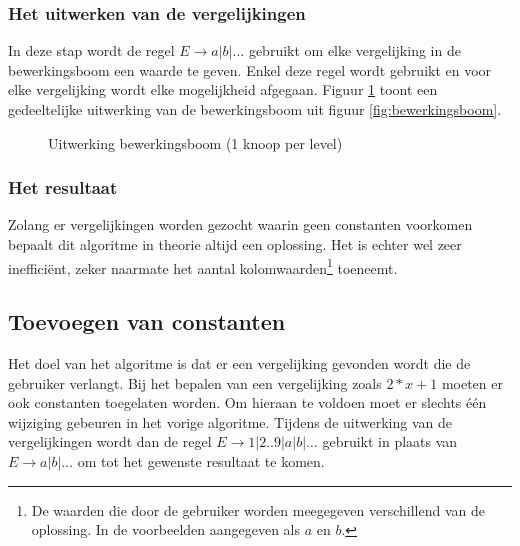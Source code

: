\documentclass[Main.tex]{subfiles}
\begin{document}
\subsubsection*{Het uitwerken van de vergelijkingen}
In deze stap wordt de regel $E \rightarrow a | b | \dotsc$ gebruikt om elke vergelijking in de bewerkingsboom een waarde te geven. Enkel deze regel wordt gebruikt en voor elke vergelijking wordt elke mogelijkheid afgegaan. Figuur \ref{fig:uitwerkingsboom} toont een gedeeltelijke uitwerking van de bewerkingsboom uit figuur \ref{fig:bewerkingsboom}.
\begin{figure}[!htb]
\centering
{}
\caption{Uitwerking bewerkingsboom (1 knoop per level)} \label{fig:uitwerkingsboom}
\end{figure}
\subsubsection*{Het resultaat}
Zolang er vergelijkingen worden gezocht waarin geen constanten voorkomen bepaalt dit algoritme in theorie altijd een oplossing. Het is echter wel zeer ineffici\"ent, zeker naarmate het aantal kolomwaarden\footnote{\label{note:kolomwaarden} De waarden die door de gebruiker worden meegegeven verschillend van de oplossing. In de voorbeelden aangegeven als $a$ en $b$.} toeneemt.

\subsection{Toevoegen van constanten}
Het doel van het algoritme is dat er een vergelijking gevonden wordt die de gebruiker verlangt. Bij het bepalen van een vergelijking zoals $2 \ast x+1$ moeten er ook constanten toegelaten worden. Om hieraan te voldoen moet er slechts \'e\'en wijziging gebeuren in het vorige algoritme. Tijdens de uitwerking van de vergelijkingen wordt dan de regel $E \rightarrow 1 | 2 .. 9 | a | b | \dotsc$ gebruikt in plaats van $E \rightarrow a | b | \dotsc$ om tot het gewenste resultaat te komen.
\end{document}
